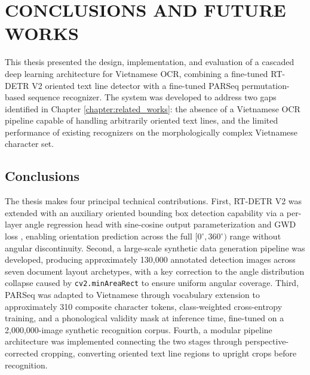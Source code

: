 
\chapter*{CONCLUSIONS AND FUTURE WORKS}

\renewcommand{\thesection}{\arabic{section}}   %
\setcounter{section}{0}

This thesis presented the design, implementation, and evaluation of a cascaded deep learning architecture for Vietnamese OCR, combining a fine-tuned RT-DETR V2 oriented text line detector with a fine-tuned PARSeq permutation-based sequence recognizer. The system was developed to address two gaps identified in Chapter \ref{chapter:related_works}: the absence of a Vietnamese OCR pipeline capable of handling arbitrarily oriented text lines, and the limited performance of existing recognizers on the morphologically complex Vietnamese character set.

\section{Conclusions}

The thesis makes four principal technical contributions. First, RT-DETR V2 was extended with an auxiliary oriented bounding box detection capability via a per-layer angle regression head with sine-cosine output parameterization and GWD loss \cite{Yang2022}, enabling orientation prediction across the full $[0^\circ, 360^\circ)$ range without angular discontinuity. Second, a large-scale synthetic data generation pipeline was developed, producing approximately 130,000 annotated detection images across seven document layout archetypes, with a key correction to the angle distribution collapse caused by \texttt{cv2.minAreaRect} to ensure uniform angular coverage. Third, PARSeq was adapted to Vietnamese through vocabulary extension to approximately 310 composite character tokens, class-weighted cross-entropy training, and a phonological validity mask at inference time, fine-tuned on a 2,000,000-image synthetic recognition corpus. Fourth, a modular pipeline architecture was implemented connecting the two stages through perspective-corrected cropping, converting oriented text line regions to upright crops before recognition.

